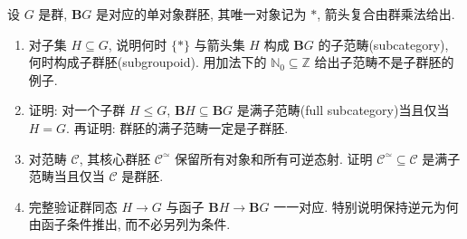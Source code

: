 \documentclass{article}
\begin{document}
\begin{problem}
  设 $G$ 是群, $\mathbf{B}G$ 是对应的单对象群胚, 其唯一对象记为 $*$, 箭头复合由群乘法给出.
  \begin{enumerate}
    \item[(a)] 对子集 $H\subseteq G$, 说明何时 $\{*\}$ 与箭头集 $H$ 构成 $\mathbf{B}G$ 的子范畴(subcategory), 何时构成子群胚(subgroupoid). 用加法下的 $\mathbb N_0\subseteq\mathbb Z$ 给出子范畴不是子群胚的例子.
    \item[(b)] 证明: 对一个子群 $H\leq G$, $\mathbf{B}H\subseteq\mathbf{B}G$ 是满子范畴(full subcategory)当且仅当 $H=G$. 再证明: 群胚的满子范畴一定是子群胚.
    \item[(c)] 对范畴 $\mathcal C$, 其核心群胚 $\mathcal C^\simeq$ 保留所有对象和所有可逆态射. 证明 $\mathcal C^\simeq\subseteq\mathcal C$ 是满子范畴当且仅当 $\mathcal C$ 是群胚.
    \item[(d)] 完整验证群同态 $H\to G$ 与函子 $\mathbf{B}H\to\mathbf{B}G$ 一一对应. 特别说明保持逆元为何由函子条件推出, 而不必另列为条件.
  \end{enumerate}
\end{problem}
\end{document}

